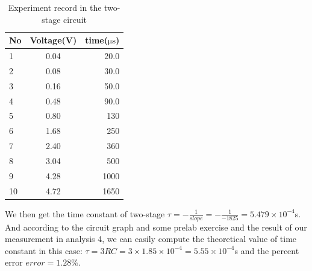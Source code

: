 \begin{table}[!htbp]\centering
	\caption{Experiment record in the two-stage circuit}
	\renewcommand\arraystretch{1.5}
	\begin{tabular}{lcr}
		\toprule
		No		&Voltage(V)	&time($\mathrm{\mu s}$)	\\
		\midrule
		1		&0.04		&20.0		\\

		2		&0.08		&30.0		\\
		
		3		&0.16		&50.0		\\
		
		4		&0.48		&90.0		\\
		
		5		&0.80		&130		\\
		
		6		&1.68		&250		\\
		
		7		&2.40		&360		\\
		
		8		&3.04		&500		\\
		
		9		&4.28		&1000		\\
		
		10		&4.72		&1650		\\
		\bottomrule
	\end{tabular}
\end{table}
We then get the time constant of two-stage 
$\tau = -\frac{1}{slope} = -\frac{1}{-1825} = 5.479\times10^{-4}$s.\\ And according to the circuit graph and some prelab exercise and the result of our measurement in analysis 4, we can easily compute
the theoretical value of time constant in this case:
$\tau = 3RC = 3\times1.85\times10^{-4} = 5.55\times10^{-4}$s and the percent error $error = 1.28\%$.\\
